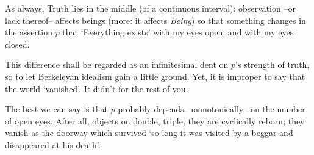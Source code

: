 As always, Truth lies in the middle (of a continuous interval): observation --or lack thereof-- affects beings (more: it affects \emph{Being}) so that something changes in the assertion $p$ that `Everything exists' with my eyes open, and with my eyes closed.

This difference shall be regarded as an infinitesimal dent on $p$'s strength of truth, so to let Berkeleyan idealism gain a little ground. Yet, it is improper to say that the world `vanished'. It didn't for the rest of you.

The best we can say is that $p$ probably depends --monotonically-- on the number of open eyes. After all, objects on \tlon double, triple, they are cyclically reborn; they vanish as the doorway which survived `so long it was visited by a beggar and disappeared at his death'.